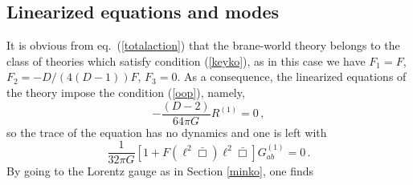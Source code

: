 \documentclass[11pt]{article}
\newcommand{\req}[1]{(\ref{#1})} %
\renewcommand{\req}[1]{eq.~(\ref{#1})}
\begin{document}
{\subsection{Linearized equations and modes}
It is obvious from \req{totalaction} that the brane-world theory belongs to the class of theories which satisfy condition (\ref{keyko}), as in this case we have $F_1=F$, $F_2=-D/(4(D-1))F$, $F_3=0$. As a consequence, the linearized equations of the theory impose the condition (\ref{oop}), namely,
\begin{equation}
-\frac{(D-2)}{64\pi G} R^{(1)}=0\, ,
\end{equation}
so the trace of the equation has no dynamics  and one is left with
\begin{equation}
\frac{1}{32\pi G} \left[1+ F(\ell^2 \bar \Box) \ell^2 \bar \Box \right] G_{ab}^{(1)}=0\, .
\end{equation}
By going to the Lorentz gauge as in Section \ref{minko}, one finds
}
\end{document}
